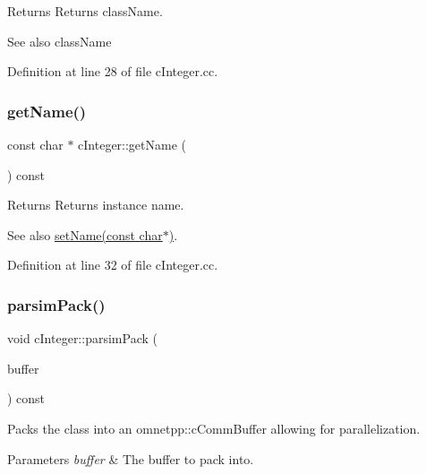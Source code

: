\begin{DoxyReturn}{Returns}
Returns class\+Name. 
\end{DoxyReturn}
\begin{DoxySeeAlso}{See also}
class\+Name 
\end{DoxySeeAlso}


Definition at line 28 of file c\+Integer.\+cc.

\mbox{\label{classcInteger_ae6bb8246d4f19d41db22ffef801afd7c}} 
\subsubsection{\texorpdfstring{get\+Name()}{getName()}}
{\footnotesize\ttfamily const char $\ast$ c\+Integer\+::get\+Name (\begin{DoxyParamCaption}{ }\end{DoxyParamCaption}) const}

\begin{DoxyReturn}{Returns}
Returns instance name. 
\end{DoxyReturn}
\begin{DoxySeeAlso}{See also}
\hyperlink{classcInteger_aba2e5e7f13408b2dbbaf4a8460affc3c}{set\+Name(const char$\ast$)}. 
\end{DoxySeeAlso}


Definition at line 32 of file c\+Integer.\+cc.

\mbox{\label{classcInteger_a79060a0e5c29e71e7ba0b8b2d509109a}} 
\subsubsection{\texorpdfstring{parsim\+Pack()}{parsimPack()}}
{\footnotesize\ttfamily void c\+Integer\+::parsim\+Pack (\begin{DoxyParamCaption}\item[{omnetpp\+::c\+Comm\+Buffer $\ast$}]{buffer }\end{DoxyParamCaption}) const}

Packs the class into an omnetpp\+::c\+Comm\+Buffer allowing for parallelization. 
\begin{DoxyParams}{Parameters}
{\em buffer} & The buffer to pack into. \\
\hline
\end{DoxyParams}



